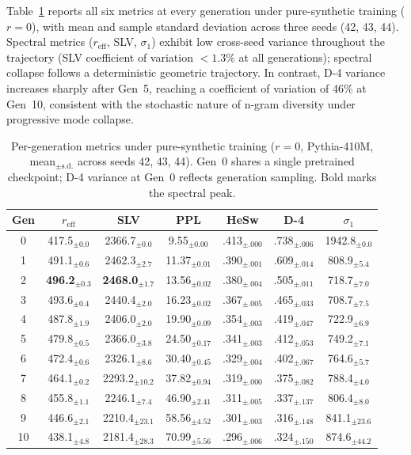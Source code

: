 Table~\ref{tab:pergen_variance} reports all six metrics at every generation under pure-synthetic training ($r{=}0$), with mean and sample standard deviation across three seeds (42, 43, 44).
Spectral metrics ($r_{\text{eff}}$, SLV, $\sigma_1$) exhibit low cross-seed variance throughout the trajectory (SLV coefficient of variation $< 1.3\%$ at all generations); spectral collapse follows a deterministic geometric trajectory.
In contrast, D-4 variance increases sharply after Gen~5, reaching a coefficient of variation of 46\% at Gen~10, consistent with the stochastic nature of n-gram diversity under progressive mode collapse.

\begin{table}[!htb]
\centering
\small
\caption{Per-generation metrics under pure-synthetic training ($r{=}0$, Pythia-410M, mean$_{\pm\text{s.d.}}$ across seeds 42, 43, 44). Gen~0 shares a single pretrained checkpoint; D-4 variance at Gen~0 reflects generation sampling. Bold marks the spectral peak.}
\label{tab:pergen_variance}
\setlength{\tabcolsep}{4pt}
\begin{tabular}{@{}ccccccc@{}}
\toprule
Gen & $r_{\text{eff}}$ & SLV & PPL & HeSw & D-4 & $\sigma_1$ \\
\midrule
 0 & 417.5$_{\pm0.0}$ & 2366.7$_{\pm0.0}$ & 9.55$_{\pm0.00}$ & .413$_{\pm.000}$ & .738$_{\pm.006}$ & 1942.8$_{\pm0.0}$ \\
 1 & 491.1$_{\pm0.6}$ & 2462.3$_{\pm2.7}$ & 11.37$_{\pm0.01}$ & .390$_{\pm.001}$ & .609$_{\pm.014}$ & 808.9$_{\pm5.4}$ \\
 2 & \textbf{496.2}$_{\pm0.3}$ & \textbf{2468.0}$_{\pm1.7}$ & 13.56$_{\pm0.02}$ & .380$_{\pm.004}$ & .505$_{\pm.011}$ & 718.7$_{\pm7.0}$ \\
 3 & 493.6$_{\pm0.4}$ & 2440.4$_{\pm2.0}$ & 16.23$_{\pm0.02}$ & .367$_{\pm.005}$ & .465$_{\pm.033}$ & 708.7$_{\pm7.5}$ \\
 4 & 487.8$_{\pm1.9}$ & 2406.0$_{\pm2.0}$ & 19.90$_{\pm0.09}$ & .354$_{\pm.003}$ & .419$_{\pm.047}$ & 722.9$_{\pm6.9}$ \\
 5 & 479.8$_{\pm0.5}$ & 2366.0$_{\pm3.8}$ & 24.50$_{\pm0.17}$ & .341$_{\pm.003}$ & .412$_{\pm.053}$ & 749.2$_{\pm7.1}$ \\
 6 & 472.4$_{\pm0.6}$ & 2326.1$_{\pm8.6}$ & 30.40$_{\pm0.45}$ & .329$_{\pm.004}$ & .402$_{\pm.067}$ & 764.6$_{\pm5.7}$ \\
 7 & 464.1$_{\pm0.2}$ & 2293.2$_{\pm10.2}$ & 37.82$_{\pm0.94}$ & .319$_{\pm.000}$ & .375$_{\pm.082}$ & 788.4$_{\pm4.0}$ \\
 8 & 455.8$_{\pm1.1}$ & 2246.1$_{\pm7.4}$ & 46.90$_{\pm2.41}$ & .311$_{\pm.005}$ & .337$_{\pm.137}$ & 806.4$_{\pm8.0}$ \\
 9 & 446.6$_{\pm2.1}$ & 2210.4$_{\pm23.1}$ & 58.56$_{\pm4.52}$ & .301$_{\pm.003}$ & .316$_{\pm.148}$ & 841.1$_{\pm23.6}$ \\
10 & 438.1$_{\pm4.8}$ & 2181.4$_{\pm28.3}$ & 70.99$_{\pm5.56}$ & .296$_{\pm.006}$ & .324$_{\pm.150}$ & 874.6$_{\pm44.2}$ \\
\bottomrule
\end{tabular}
\end{table}

